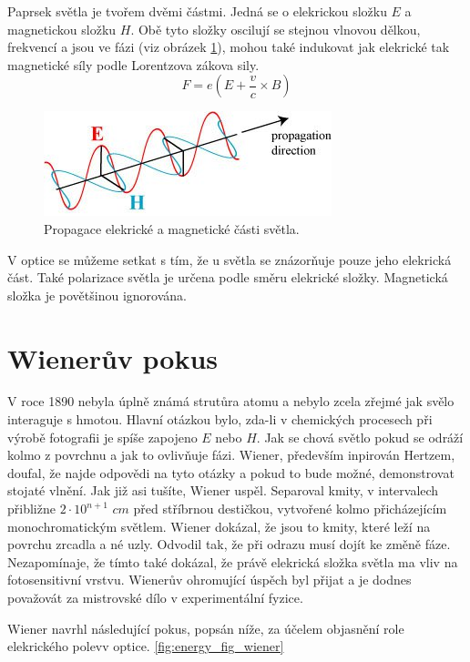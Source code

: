 \documentclass[12pt,a4paper,titlepage,final]{report}
\begin{document}
Paprsek světla je tvořem dvěmi částmi. Jedná se o elekrickou složku
$E$ a magnetickou složku $H$. Obě tyto složky oscilují se stejnou
vlnovou dělkou, frekvencí a jsou ve fázi (viz obrázek \ref{fig:ehpropagation}), mohou také indukovat jak elekrické tak magnetické síly podle Lorentzova zákova sily. \citep{skullsinthestars}
\begin{equation}
F = e(E+\frac{v}{c}\times B)
\end{equation}

\begin{figure}[!htb]
   \centering
 	\includegraphics{ehpropagation}
   \caption{Propagace elekrické a magnetické části světla.}
   \label{fig:ehpropagation}
\end{figure}

V optice se můžeme setkat s tím, že u světla se znázorňuje pouze jeho
elekrická část. Také polarizace světla je určena podle směru elekrické složky. Magnetická složka je povětšinou ignorována.

\section{Wienerův pokus}
V roce 1890 nebyla úplně známá strutůra atomu a nebylo zcela zřejmé
jak svělo interaguje s hmotou. Hlavní otázkou bylo, zda-li
v chemických procesech při výrobě fotografii je spíše zapojeno 
$E$ nebo $H$. Jak se chová světlo pokud se odráží kolmo z povrchnu a jak to ovlivňuje fázi. 
Wiener, především inpirován Hertzem, doufal, že najde odpovědi na tyto otázky a pokud to bude možné,
demonstrovat stojaté vlnění. Jak již asi tušíte, Wiener uspěl. Separoval kmity, v intervalech přibližne $2\cdot 10^{n+1}$ $cm$ před
stříbrnou destičkou, vytvořené kolmo přicházejícím monochromatickým světlem. Wiener dokázal, že jsou to kmity, které leží
na povrchu zrcadla a né uzly. Odvodil tak, že při odrazu musí dojít ke změně fáze. Nezapomínaje, že tímto také dokázal, že právě
elekrická složka světla ma vliv na fotosensitivní vrstvu. Wienerův ohromující úspěch byl přijat a je dodnes považovát za mistrovské dílo
v experimentální fyzice.

Wiener navrhl následující pokus, popsán níže, za účelem objasnění role elekrického polevv optice. \ref{fig:energy_fig_wiener}
\end{document}
